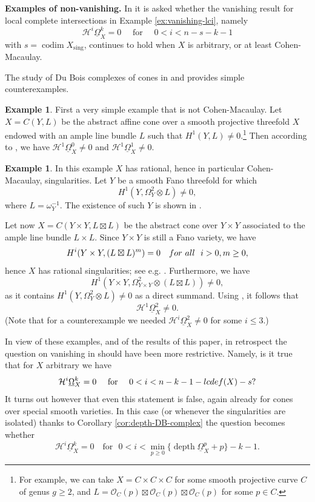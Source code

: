 \documentclass[11pt]{amsart}
\theoremstyle{definition}
\newtheorem{example}[equation]{Example}
\theoremstyle{plain}
\renewcommand{\H}{\mathcal H}
\renewcommand{\O}{\mathcal O}
\newcommand{\DB}{\underline{\Omega}} %
\DeclareMathOperator{\sing}{sing}
\DeclareMathOperator{\codim}{codim}
\DeclareMathOperator{\depth}{depth}
\begin{document}
\noindent
{\bf Examples of non-vanishing.}
In \cite[Question 13.10]{MP-LC} it is asked whether the vanishing result for local complete intersections in Example \ref{ex:vanishing-lci}, namely 
\[\H^i\DB_X^k = 0 \quad\text{ for }\quad 0<i< n-s-k-1\]
with $s=\codim X_{\sing}$, continues to hold when $X$ is arbitrary, or at least Cohen-Macaulay.

The study of Du Bois complexes of cones in \cite{SVV} and \cite{PSh} provides simple counterexamples. 

\begin{example}	
First a very simple example that is not Cohen-Macaulay. Let $X =C( Y,L)$ be the abstract affine cone over a smooth projective threefold $X$ endowed with an ample line bundle $L$ such that $H^1(Y,L)\neq 0$.\footnote{For example, we can take $X= C\times C\times C$ for some smooth projective curve $C$ of genus $g\ge 2$, and $L = \O_C(p)\boxtimes \O_C(p)\boxtimes \O_C (p)$ for some $p \in C$.}
Then according to \cite[Proposition 7.2]{SVV}, we have $\H^1\DB_X^0\neq 0$ and $\H^1\DB_X^1\neq 0$.
\end{example}

\begin{example}
In this example $X$ has rational, hence in particular Cohen-Macaulay, singularities. Let $Y$ be a smooth Fano threefold for which 
	\[H^1(Y, \Omega_Y^2\otimes L)\neq 0,\]
	where $L=\omega_Y^{-1}$. The existence of such $Y$ is shown in \cite[Section 2]{Totaro}.
	
Let now $X =C( Y\times Y, L\boxtimes L)$ be the abstract cone over $Y\times Y$ associated to the ample line bundle $L\times L$. Since 
$Y\times Y$ is still a Fano variety, we have 
$$H^i (Y \times Y, (L \boxtimes L)^m) = 0 \,\,\,\,\,\,{\rm for~all} \,\,\,\,i > 0, m\ge 0,$$
hence $X$ has rational singularities; see e.g. \cite[Remark 7.8]{SVV}. Furthermore, we have 
	\[H^1(Y\times Y, \Omega_{Y\times Y}^2\otimes (L\boxtimes L))\neq 0,\]
	as it contains $H^1(Y, \Omega_Y^2\otimes L)\neq 0$ as a direct summand. Using \cite[Proposition 7.2]{SVV}, it follows that
	\[\H^1\DB_X^2\neq 0.\]
(Note that for a counterexample we needed $\H^i \DB_X^2\neq 0$ for some $i \le 3$.)
\end{example}


In view of these examples, and of the results of this paper, in retrospect the question on vanishing in \cite{MP-LC} should have been more restrictive. Namely, is it true that for $X$ arbitrary we have
\begin{equation}\label{eqn:modified}
\H^i\DB_X^k = 0 \quad\text{ for }\quad 0<i< n-k-1- {\rm lcdef}(X) - s?
\end{equation}
It turns out however that even this statement is false, again already for cones over special smooth varieties. In this case (or whenever the singularities are isolated) thanks to Corollary \ref{cor:depth-DB-complex} the question becomes whether
\[\H^i\DB_X^k = 0 \,\,\,\,\,\, \text{for} \,\,\,\, 0 <  i< \min_{p\ge 0}\{\depth \DB_X^p + p\}-k-1.\]
\end{document}
